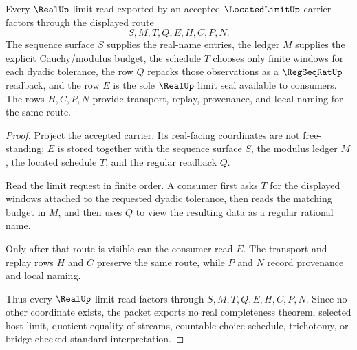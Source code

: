 \begin{theorem}
\label{thm:located-limit-real-seal-route}
Every $\RealUp$ limit read exported by an accepted $\LocatedLimitUp$ carrier factors through the displayed route
$$
S,M,T,Q,E,H,C,P,N .
$$
The sequence surface $S$ supplies the real-name entries, the ledger $M$ supplies the explicit Cauchy/modulus budget, the schedule $T$ chooses only finite windows for each dyadic tolerance, the row $Q$ repacks those observations as a $\RegSeqRatUp$ readback, and the row $E$ is the sole $\RealUp$ limit seal available to consumers. The rows $H,C,P,N$ provide transport, replay, provenance, and local naming for the same route.
\end{theorem}
\begin{proof}
Project the accepted carrier. Its real-facing coordinates are not free-standing; $E$ is stored together with the sequence surface $S$, the modulus ledger $M$, the located schedule $T$, and the regular readback $Q$.

Read the limit request in finite order. A consumer first asks $T$ for the displayed windows attached to the requested dyadic tolerance, then reads the matching budget in $M$, and then uses $Q$ to view the resulting data as a regular rational name.

Only after that route is visible can the consumer read $E$. The transport and replay rows $H$ and $C$ preserve the same route, while $P$ and $N$ record provenance and local naming.

Thus every $\RealUp$ limit read factors through $S,M,T,Q,E,H,C,P,N$. Since no other coordinate exists, the packet exports no real completeness theorem, selected host limit, quotient equality of streams, countable-choice schedule, trichotomy, or bridge-checked standard interpretation.
\end{proof}

